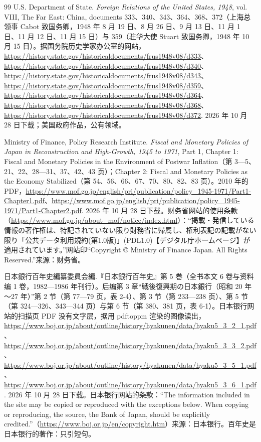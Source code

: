 \begin{thebibliography}{99}
 U.S. Department of State. \emph{Foreign Relations of the United States, 1948}, vol. VIII, The Far East: China, documents 333、340、343、364、368、372（上海总领事 Cabot 致国务卿，1948 年 8 月 19 日、8 月 26 日、9 月 13 日、11 月 1 日、11 月 12 日、11 月 15 日）与 359（驻华大使 Stuart 致国务卿，1948 年 10 月 15 日）。据国务院历史学家办公室的网站，\url{https://history.state.gov/historicaldocuments/frus1948v08/d333}、\url{https://history.state.gov/historicaldocuments/frus1948v08/d340}、\url{https://history.state.gov/historicaldocuments/frus1948v08/d343}、\url{https://history.state.gov/historicaldocuments/frus1948v08/d359}、\url{https://history.state.gov/historicaldocuments/frus1948v08/d364}、\url{https://history.state.gov/historicaldocuments/frus1948v08/d368}、\url{https://history.state.gov/historicaldocuments/frus1948v08/d372}. 2026 年 10 月 28 日下载；美国政府作品，公有领域。

 Ministry of Finance, Policy Research Institute. \emph{Fiscal and Monetary Policies of Japan in Reconstruction and High-Growth, 1945 to 1971}, Part 1, Chapter 1: Fiscal and Monetary Policies in the Environment of Postwar Inflation（第 3—5、21、22、28—31、37、42、43 页）；Chapter 2: Fiscal and Monetary Policies as the Economy Stabilized（第 54、56、66、67、70、80、82、83 页）。2010 年的 PDF，\url{https://www.mof.go.jp/english/pri/publication/policy_1945-1971/Part1-Chapter1.pdf}、\url{https://www.mof.go.jp/english/pri/publication/policy_1945-1971/Part1-Chapter2.pdf}. 2026 年 10 月 28 日下载。财务省网站的使用条款（\url{https://www.mof.go.jp/about_mof/notice/index.html}）：“掲載・発信している情報の著作権は、特記されていない限り財務省に帰属し、権利表記の記載がない限り「公共データ利用規約(第1.0版)」(PDL1.0)【デジタル庁ホームページ】が適用されています。”网站印“Copyright © Ministry of Finance Japan. All Rights Reserved.”来源：财务省。

 日本銀行百年史編纂委員会編.『日本銀行百年史』第 5 巻（全书本文 6 卷与资料编 1 卷，1982—1986 年刊行）。后编第 3 章“戦後復興期の日本銀行（昭和 20 年～27 年）”第 2 节（第 77—79 页，表 2-4）、第 3 节（第 233—238 页）、第 5 节（第 324—326、343—344 页）与第 6 节（第 380、381 页，表 6-1）。日本银行网站的扫描页 PDF 没有文字层，据用 pdftoppm 渲染的图像读出，\url{https://www.boj.or.jp/about/outline/history/hyakunen/data/hyaku5_3_2_1.pdf}、\url{https://www.boj.or.jp/about/outline/history/hyakunen/data/hyaku5_3_3_2.pdf}、\url{https://www.boj.or.jp/about/outline/history/hyakunen/data/hyaku5_3_5_1.pdf}、\url{https://www.boj.or.jp/about/outline/history/hyakunen/data/hyaku5_3_6_1.pdf}. 2026 年 10 月 28 日下载。日本银行网站的条款：“The information included in the site may be copied or reproduced with the exceptions below. When copying or reproducing, the source, the Bank of Japan, should be explicitly credited.”（\url{https://www.boj.or.jp/en/copyright.htm}）来源：日本银行。百年史是日本银行的著作：只引短句。


\end{thebibliography}
